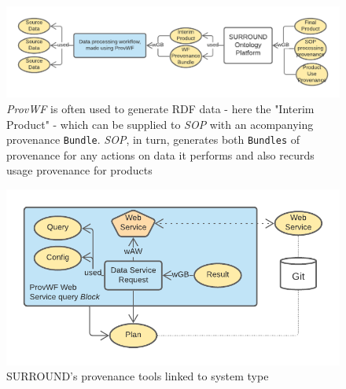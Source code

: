 \documentclass[letterpaper,twocolumn,10pt]{article}
\begin{document}
\begin{figure}
  \begin{center}
    \includegraphics[width=\textwidth]{images/provwf-to-sop.png}
  \end{center}
  \caption{\label{fig:overview} \textit{ProvWF} is often used to generate RDF data - here the "Interim Product" - which can be supplied to \textit{SOP} with an acompanying provenance \texttt{Bundle}. \textit{SOP}, in turn, generates both \texttt{Bundles} of provenance for any actions on data it performs and also recurds usage provenance for products}
  \end{figure}

\begin{figure}
  \begin{center}
    \includegraphics[width=\textwidth]{images/data-service.png}
  \end{center}
  \caption{\label{fig:overview} SURROUND's provenance tools linked to system type}
  \end{figure}
\end{document}
